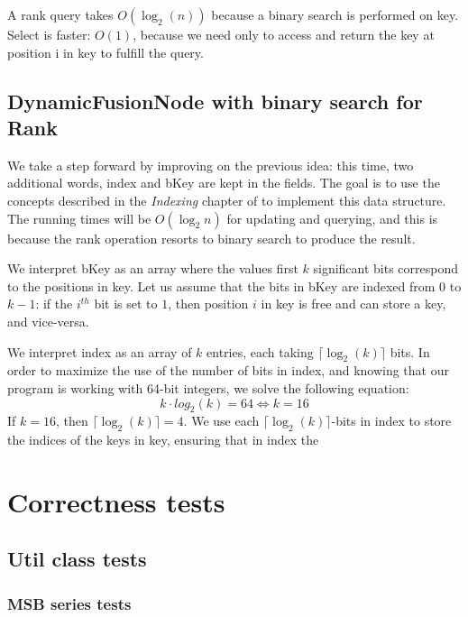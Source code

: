 A rank query takes $O(\log_2(n))$ because a binary search is performed on {\ttfamily key}. Select is faster: $O(1)$, because we need only to access and return the key at position {\ttfamily i} in {\ttfamily key} to fulfill the query.

\section{DynamicFusionNode with binary search for Rank}
We take a step forward by improving on the previous idea: this time, two additional words, {\ttfamily index} and {\ttfamily bKey} are kept in the fields. The goal is to use the concepts described in the \textit{Indexing} chapter of \cite{patrascu2014dynamic} to implement this data structure. The running times will be $O(\log_2 n)$ for updating and querying, and this is because the {\ttfamily rank} operation resorts to binary search to produce the result.

We interpret {\ttfamily bKey} as an array where the values first $k$ significant bits correspond to the positions in {\ttfamily key}. Let us assume that the bits in {\ttfamily bKey} are indexed from $0$ to $k-1$: if the $i^{th}$ bit is set to $1$, then position $i$ in {\ttfamily key} is free and can store a key, and vice-versa.

We interpret {\ttfamily index} as an array of $k$ entries, each taking $\lceil \log_2(k) \rceil$ bits. In order to maximize the use of the number of bits in {\ttfamily index}, and knowing that our program is working with 64-bit integers, we solve the following equation:
\begin{equation}
    k \cdot log_2(k) = 64 \iff k = 16
\end{equation}
If $k=16$, then $\lceil \log_2(k) \rceil = 4$. We use each $\lceil \log_2(k) \rceil$-bits in {\ttfamily index} to store the indices of the keys in {\ttfamily key}, ensuring that in {\ttfamily index} the

\chapter{Correctness tests}

\section{{\ttfamily Util} class tests}

\subsection{MSB series tests}

